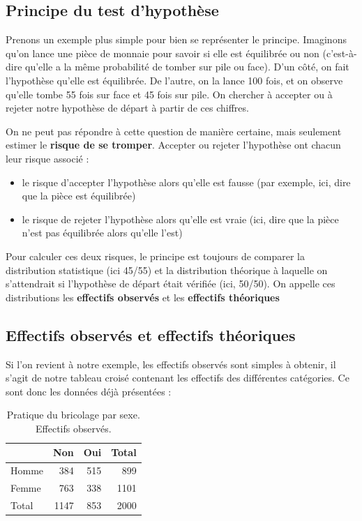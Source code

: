 \documentclass[
]{book}
\providecommand{\tightlist}{%
  \setlength{\itemsep}{0pt}\setlength{\parskip}{0pt}}
\begin{document}
\hypertarget{principe-du-test-dhypothuxe8se}{%
\subsection{Principe du test d'hypothèse}\label{principe-du-test-dhypothuxe8se}}

Prenons un exemple plus simple pour bien se représenter le principe. Imaginons qu'on lance une pièce de monnaie pour savoir si elle est équilibrée ou non (c'est-à-dire qu'elle a la même probabilité de tomber sur pile ou face). D'un côté, on fait l'hypothèse qu'elle est équilibrée. De l'autre, on la lance 100 fois, et on observe qu'elle tombe 55 fois sur face et 45 fois sur pile. On chercher à accepter ou à rejeter notre hypothèse de départ à partir de ces chiffres.

On ne peut pas répondre à cette question de manière certaine, mais seulement estimer le \textbf{risque de se tromper}. Accepter ou rejeter l'hypothèse ont chacun leur risque associé :

\begin{itemize}
\tightlist
\item
  le risque d'accepter l'hypothèse alors qu'elle est fausse (par exemple, ici, dire que la pièce est équilibrée)
\item
  le risque de rejeter l'hypothèse alors qu'elle est vraie (ici, dire que la pièce n'est pas équilibrée alors qu'elle l'est)
\end{itemize}

Pour calculer ces deux risques, le principe est toujours de comparer la distribution statistique (ici 45/55) et la distribution théorique à laquelle on s'attendrait si l'hypothèse de départ était vérifiée (ici, 50/50). On appelle ces distributions les \textbf{effectifs observés} et les \textbf{effectifs théoriques}

\hypertarget{effectifs-observuxe9s-et-effectifs-thuxe9oriques}{%
\subsection{Effectifs observés et effectifs théoriques}\label{effectifs-observuxe9s-et-effectifs-thuxe9oriques}}

Si l'on revient à notre exemple, les effectifs observés sont simples à obtenir, il s'agit de notre tableau croisé contenant les effectifs des différentes catégories. Ce sont donc les données déjà présentées :

\begin{table}

\caption{\label{tab:unnamed-chunk-23}Pratique du bricolage par sexe. Effectifs observés.}
\centering
\begin{tabular}[t]{l|r|r|r}
\hline
  & Non & Oui & Total\\
\hline
Homme & 384 & 515 & 899\\
\hline
Femme & 763 & 338 & 1101\\
\hline
Total & 1147 & 853 & 2000\\
\hline
\end{tabular}
\end{table}
\end{document}
